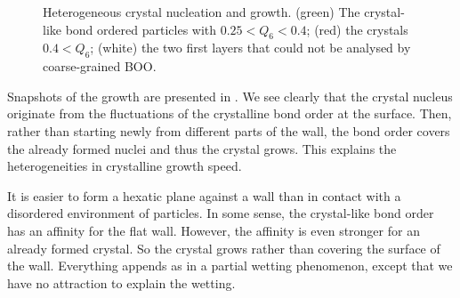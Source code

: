 \begin{figure}
	\caption{Heterogeneous crystal nucleation and growth. (green) The crystal-like bond ordered particles with $0.25<Q_6<0.4$; (red) the crystals $0.4<Q_6$; (white) the two first layers that could not be analysed by coarse-grained \acs{BOO}.}
	\label{fig:X_growth}
\end{figure}

Snapshots of the growth are presented in . We see clearly that the crystal nucleus originate from the fluctuations of the crystalline bond order at the surface. Then, rather than starting newly from different parts of the wall, the bond order covers the already formed nuclei and thus the crystal grows. This explains the heterogeneities in crystalline growth speed.

It is easier to form a hexatic plane against a wall than in contact with a disordered environment of particles. In some sense, the crystal-like bond order has an affinity for the flat wall. However, the affinity is even stronger for an already formed crystal. So the crystal grows rather than covering the surface of the wall. Everything appends as in a partial wetting phenomenon, except that we have no attraction to explain the wetting.

